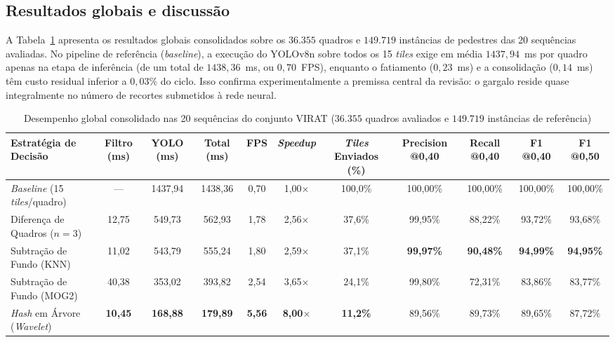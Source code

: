 \documentclass{ieeeaccess}
\begin{document}
\subsection{Resultados globais e discussão}
\label{subsec:analise_resultados}

A Tabela~\ref{tab:resultados_gerais} apresenta os resultados globais consolidados sobre os $36.355$ quadros e $149.719$ instâncias de pedestres das 20 sequências avaliadas. No pipeline de referência (\textit{baseline}), a execução do YOLOv8n sobre todos os 15 \textit{tiles} exige em média $1437{,}94$~ms por quadro apenas na etapa de inferência (de um total de $1438{,}36$~ms, ou $0{,}70$~FPS), enquanto o fatiamento ($0{,}23$~ms) e a consolidação ($0{,}14$~ms) têm custo residual inferior a $0{,}03\%$ do ciclo. Isso confirma experimentalmente a premissa central da revisão: o gargalo reside quase integralmente no número de recortes submetidos à rede neural.

\begin{table}[t!]
\caption{Desempenho global consolidado nas 20 sequências do conjunto VIRAT ($36.355$ quadros avaliados e $149.719$ instâncias de referência)}
\label{tab:resultados_gerais}
\centering
\setlength{\tabcolsep}{5pt}
\begin{tabular}{lcccccccccc}
\toprule
\textbf{Estratégia de Decisão} & \textbf{Filtro (ms)} & \textbf{YOLO (ms)} & \textbf{Total (ms)} & \textbf{FPS} & \textbf{\textit{Speedup}} & \textbf{\textit{Tiles} Enviados (\%)} & \textbf{Precision @0,40} & \textbf{Recall @0,40} & \textbf{F1 @0,40} & \textbf{F1 @0,50} \\
\midrule
\textit{Baseline} (15 \textit{tiles}/quadro) & ---   & 1437,94 & 1438,36 & 0,70 & 1,00$\times$ & 100,0\% & 100,00\% & 100,00\% & 100,00\% & 100,00\% \\
Diferença de Quadros ($n=3$)                 & 12,75 & 549,73  & 562,93  & 1,78 & 2,56$\times$ & 37,6\%  & 99,95\%  & 88,22\%  & 93,72\%  & 93,68\%  \\
Subtração de Fundo (KNN)                     & 11,02 & 543,79  & 555,24  & 1,80 & 2,59$\times$ & 37,1\%  & \textbf{99,97\%}  & \textbf{90,48\%}  & \textbf{94,99\%}  & \textbf{94,95\%}  \\
Subtração de Fundo (MOG2)                    & 40,38 & 353,02  & 393,82  & 2,54 & 3,65$\times$ & 24,1\%  & 99,80\%  & 72,31\%  & 83,86\%  & 83,77\%  \\
\textit{Hash} em Árvore (\textit{Wavelet})   & \textbf{10,45} & \textbf{168,88}  & \textbf{179,89}  & \textbf{5,56} & \textbf{8,00$\times$} & \textbf{11,2\%}  & 89,56\%  & 89,73\%  & 89,65\%  & 87,72\%  \\
\bottomrule
\end{tabular}
\end{table}
\end{document}
